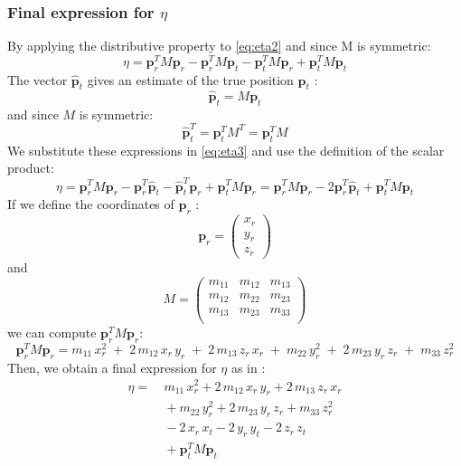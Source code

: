 \subsubsection{Final expression for $\eta$}
By applying the distributive property to \ref{eq:eta2} and since M is symmetric:
\begin{equation}
    \eta = \mathbf{p}_r^T M \mathbf{p}_r - \mathbf{p}_r^T M \mathbf{p}_t - \mathbf{p}_t^T M \mathbf{p}_r+ \mathbf{p}_t^T M \mathbf{p}_t
    \label{eq:eta3}
\end{equation}
The vector $\mathbf{\hat{p}}_t$ gives an estimate of the true position $\mathbf{p}_t$ :
\[
\mathbf{\hat{p}}_t = M \mathbf{p}_t
\]
and since $M$ is symmetric:
\[
\mathbf{\hat{p}}_t^T =  \mathbf{p}_t^T M^T = \mathbf{p}_t^T M
\]
We substitute these expressions in \ref{eq:eta3} and use the definition of the scalar product:
\[
\eta = \mathbf{p}_r^T M \mathbf{p}_r - \mathbf{p}_r^T \mathbf{\hat{p}}_t - \mathbf{\hat{p}}_t^T \mathbf{p}_r+ \mathbf{p}_t^T M \mathbf{p}_r = \mathbf{p}_r^T M \mathbf{p}_r - 2 \mathbf{p}_r^T \mathbf{\hat{p}}_t + \mathbf{p}_t^T M \mathbf{p}_t
\]
If we define the coordinates of $\mathbf{p}_r$ :
\[
\mathbf{p}_r = \begin{pmatrix}
    x_r \\
    y_r \\
    z_r
\end{pmatrix}
\]
and
\[
M = \begin{pmatrix}
    m_{11} & m_{12} & m_{13} \\
    m_{12} & m_{22} & m_{23} \\
    m_{13} & m_{23} & m_{33} \\
\end{pmatrix}
\]
we can compute $\mathbf{p}_r^T M \mathbf{p}_r$:
\[
\mathbf{p}_r^T M \mathbf{p}_r = 
m_{11} \, x_r^2 \; + \; 2 \, m_{12} \, x_r \, y_r \; + \; 2 \, m_{13} \, z_r \, x_r \; + \;
m_{22} \, y_r^2 \; + \; 2 \, m_{23} \, y_r \, z_r \; + \; m_{33} \, z_r^2
\]
Then, we obtain a final expression for $\eta$ as in \cite{main}:
\begin{equation}
\begin{aligned}
\eta = & \ m_{11} \, x_r^2 + 2 \, m_{12} \, x_r \, y_r + 2 \, m_{13} \, z_r \, x_r \\
       & \ + m_{22} \, y_r^2 + 2 \, m_{23} \, y_r \, z_r + m_{33} \, z_r^2 \\
       & \ - 2 \, x_r \, x_t - 2 \, y_r \, y_t - 2 \, z_r \, z_t \\
       & \ + \mathbf{p}_t^T M \mathbf{p}_t
\end{aligned}
\label{eq:eta_final}
\end{equation}



